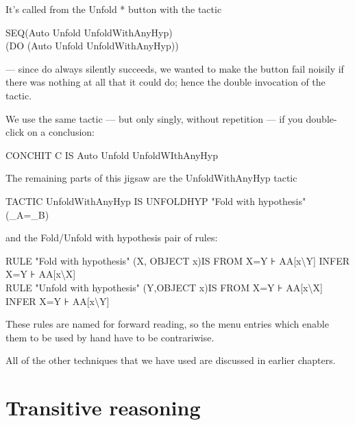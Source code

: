 It's called from the Unfold * button with the tactic

SEQ\tab (Auto Unfold UnfoldWithAnyHyp) \\
\tab (DO (Auto Unfold UnfoldWithAnyHyp))


--- since do always silently succeeds, we wanted to make the button fail noisily if there was nothing at all that it could do; hence the double invocation of the tactic.


We use the same tactic --- but only singly, without repetition --- if you double-click on a conclusion:

CONCHIT C IS Auto Unfold UnfoldWIthAnyHyp


The remaining parts of this jigsaw are the UnfoldWithAnyHyp tactic

TACTIC UnfoldWithAnyHyp IS UNFOLDHYP "Fold with hypothesis" (\_A=\_B)


and the Fold/Unfold with hypothesis pair of rules:

RULE "Fold with hypothesis" (X, OBJECT x)\tab IS FROM X=Y ⊦ AA[x{\textbackslash}Y] INFER X=Y ⊦ AA[x{\textbackslash}X]\\
RULE "Unfold with hypothesis" (Y,OBJECT x)\tab IS FROM X=Y ⊦ AA[x{\textbackslash}X] INFER X=Y ⊦ AA[x{\textbackslash}Y]


These rules are named for forward reading, so the menu entries which enable them to be used by hand have to be contrariwise.


All of the other techniques that we have used are discussed in earlier chapters.

\section{Transitive reasoning} 